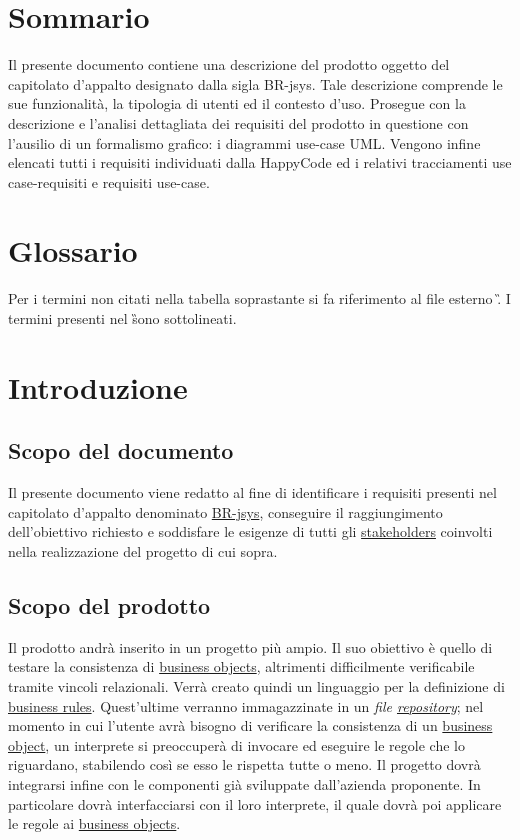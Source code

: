 \tableofcontents
\chapter*{Sommario}
Il presente documento contiene una descrizione del prodotto oggetto del capitolato d'appalto designato dalla sigla BR-jsys. Tale descrizione
comprende le sue funzionalit\`a, la tipologia di utenti ed il contesto d'uso. Prosegue con la descrizione e l'analisi dettagliata dei requisiti del prodotto in questione con l'ausilio di un formalismo grafico: i diagrammi use-case UML. Vengono infine elencati tutti i requisiti individuati dalla
HappyCode ed i relativi tracciamenti use case-requisiti e requisiti use-case.

\chapter*{Glossario}
Per i termini non citati nella tabella soprastante si fa riferimento al file esterno \G. I termini presenti nel \G sono sottolineati.

\chapter{Introduzione}
\section{Scopo del documento}
Il presente documento viene redatto al fine di identificare i requisiti presenti nel capitolato d'appalto denominato \underline{BR-jsys}, conseguire il raggiungimento dell'obiettivo richiesto e soddisfare le esigenze di tutti gli \underline{stakeholders} coinvolti nella realizzazione del progetto di cui sopra.
\section{Scopo del prodotto}
Il prodotto andr\`a inserito in un progetto pi\`u ampio. Il suo obiettivo \`e quello di testare la consistenza di \underline{business objects}, altrimenti difficilmente verificabile tramite vincoli relazionali.
Verr\`a creato quindi un linguaggio per la definizione di \underline{business rules}. Quest'ultime verranno immagazzinate in un \textit{file \underline{repository}}; nel momento in cui l'utente avr\`a bisogno di verificare la consistenza di un \underline{business object}, un interprete si preoccuper\`a di invocare ed eseguire le regole che lo riguardano, stabilendo cos\`i se esso le rispetta tutte o meno.
Il progetto dovr\`a integrarsi infine con le componenti gi\`a sviluppate dall'azienda proponente. In particolare dovr\`a interfacciarsi con il loro interprete, il quale dovr\`a poi applicare le regole ai \underline{business objects}.
